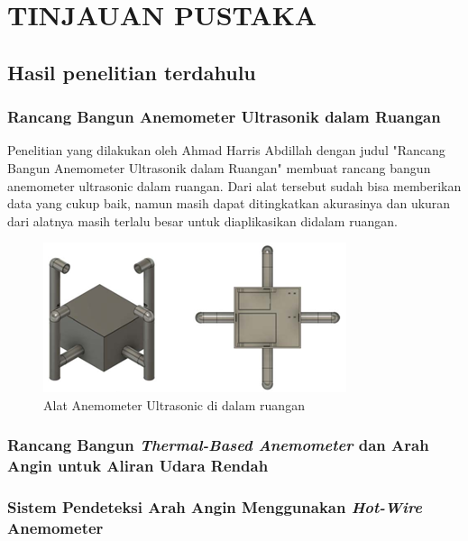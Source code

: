 \section{TINJAUAN PUSTAKA}

\subsection{Hasil penelitian terdahulu}
\subsubsection{Rancang Bangun Anemometer Ultrasonik dalam Ruangan}
Penelitian yang dilakukan oleh Ahmad Harris Abdillah dengan judul "Rancang Bangun Anemometer Ultrasonik dalam Ruangan" \parencite{Newton1687} membuat rancang bangun anemometer ultrasonic dalam ruangan. Dari alat tersebut sudah bisa memberikan data yang cukup baik, namun masih dapat ditingkatkan akurasinya dan ukuran dari alatnya masih terlalu besar untuk diaplikasikan didalam ruangan.

\begin{figure}[h!]
	\label{abdillah_anemo_skema}
	\includegraphics[width=\linewidth]{gambar/fig_anemometer_abdillah_skema}
	\caption{Alat Anemometer Ultrasonic di dalam ruangan
	\parencite{Abdillah, 2022}}
\end{figure}

\subsubsection{Rancang Bangun \emph{Thermal-Based Anemometer} dan Arah Angin untuk Aliran Udara Rendah}

\subsubsection{Sistem Pendeteksi Arah Angin Menggunakan \textit{Hot-Wire} Anemometer}

